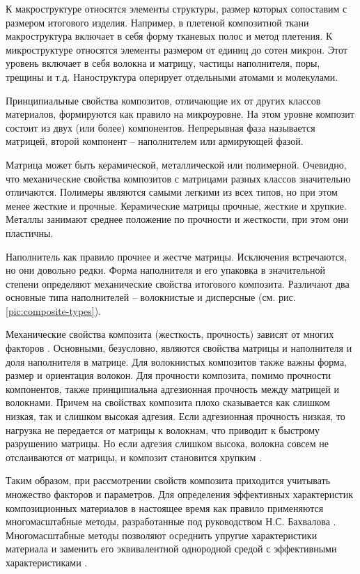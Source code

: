 К макроструктуре относятся элементы структуры, размер которых сопоставим с размером итогового изделия. Например, в плетеной композитной ткани макроструктура включает в себя форму тканевых полос и метод плетения. К микроструктуре относятся элементы размером от единиц до сотен микрон. Этот уровень включает в себя волокна и матрицу, частицы наполнителя, поры, трещины и т.д. Наноструктура оперирует отдельными атомами и молекулами.

Принципиальные свойства композитов, отличающие их от других классов материалов, формируются как правило на микроуровне. На этом уровне композит состоит из двух (или более) компонентов. Непрерывная фаза называется матрицей, второй компонент -- наполнителем или армирующей фазой.

Матрица может быть керамической, металлической или полимерной. Очевидно, что механические свойства композитов с матрицами разных классов значительно отличаются. Полимеры являются самыми легкими из всех типов, но при этом менее жесткие и прочные. Керамические матрицы прочные, жесткие и хрупкие. Металлы занимают среднее положение по прочности и жесткости, при этом они пластичны.

Наполнитель как правило прочнее и жестче матрицы. Исключения встречаются, но они довольно редки. Форма наполнителя и его упаковка в значительной степени определяют механические свойства итогового композита. Различают два основные типа наполнителей -- волокнистые и дисперсные (см. рис. \ref{pic:composite-types}).

Механические свойства композита (жесткость, прочность) зависят от многих факторов \cite{rosen, guz}. Основными, безусловно, являются свойства матрицы и наполнителя и доля наполнителя в матрице. Для волокнистых композитов также важны форма, размер и ориентация волокон. Для прочности композита, помимо прочности компонентов, также принципиальна адгезионная прочность между матрицей и волокнами. Причем на свойствах композита плохо сказывается как слишком низкая, так и слишком высокая адгезия. Если адгезионная прочность низкая, то нагрузка не передается от матрицы к волокнам, что приводит к быстрому разрушению матрицы. Но если адгезия слишком высока, волокна совсем не отслаиваются от матрицы, и композит становится хрупким \cite{regel, deteresa}.

Таким образом, при рассмотрении свойств композита приходится учитывать множество факторов и параметров. Для определения эффективных характеристик композиционных материалов в настоящее время как правило применяются многомасштабные методы, разработанные под руководством Н.С. Бахвалова \cite{bahvalov}. Многомасштабные методы позволяют осреднить упругие характеристики материала и заменить его эквивалентной однородной средой с эффективными характеристиками \cite{dimitrienko1, dimitrienko2}.

